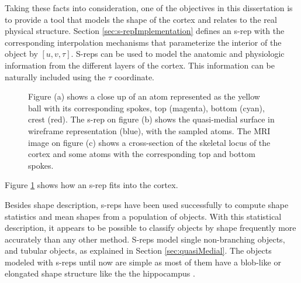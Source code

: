 Taking these facts into consideration, one of the objectives in this dissertation is to provide a
tool that models the shape of the cortex and relates to the real physical structure. 
Section \ref{sec:s-repImplementation} defines an s-rep
with the corresponding interpolation mechanisms that parameterize the interior of the object by $[u, v, \tau]$.
S-reps can be used to model the anatomic and physiologic information from the different layers of the cortex.
This information can be naturally included using the $\tau$ coordinate.

\begin{figure} 
 \centering 
 \caption[Atom close up.]{Figure (a) shows a close up of an atom represented as the yellow ball with its corresponding spokes, top (magenta), bottom (cyan), crest (red). 
          The s-rep on figure (b) shows the quasi-medial surface in wireframe representation (blue), with the sampled atoms.
          The MRI image on figure (c) shows a cross-section of the skeletal locus of the cortex and some atoms with the corresponding top and bottom spokes.}
 \label{fig:srepfigCortex}  
\end{figure}

Figure \ref{fig:srepfigCortex} shows how an s-rep fits into the cortex. 

Besides shape description, s-reps have been used successfully to compute shape statistics and mean shapes from a population 
of objects. 
With this statistical description, it appears to be possible to classify objects by shape frequently more accurately than any other method.
S-reps model single non-branching objects, and tubular objects, as explained in Section \ref{sec:quasiMedial}.
The objects modeled with s-reps until now are simple as most of them have a 
blob-like or elongated shape structure like the the hippocampus \cite{pizer_nested_2012}.

